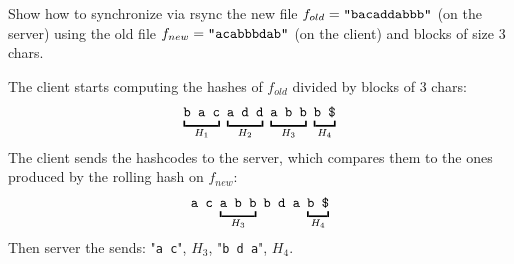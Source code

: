 \exercise

Show how to synchronize via rsync the new file $f_{old} = \text{\tt
“bacaddabbb”}$ (on the server) using the old file $f_{new} = \text{\tt
“acabbbdab”}$ (on the client) and blocks of size 3 chars.

\solution

The client starts computing the hashes of $f_{old}$ divided by blocks
of 3 chars:
%
\begin{align*}
  \underbracket{\vphantom{\tt g}\texttt{b a c}}_{H_1}\
  \underbracket{\vphantom{\tt g}\texttt{a d d}}_{H_2}\
  \underbracket{\vphantom{\tt g}\texttt{a b b}}_{H_3}\
  \underbracket{\vphantom{\tt g}\texttt{b \$}}_{H_4}
\end{align*}
The client sends the hashcodes to the server, which compares them to the ones
produced by the rolling hash on $f_{new}$:
%
\begin{align*}
  \texttt{a c}\
  \underbracket{\vphantom{\tt g}\texttt{a b b}}_{H_3}\ \texttt{b d a}\
  \underbracket{\vphantom{\tt g}\texttt{b \$}}_{H_4}
\end{align*}
%
Then server the sends: "{\tt a c}", $H_3$, "{\tt b d a}", $H_4$.
